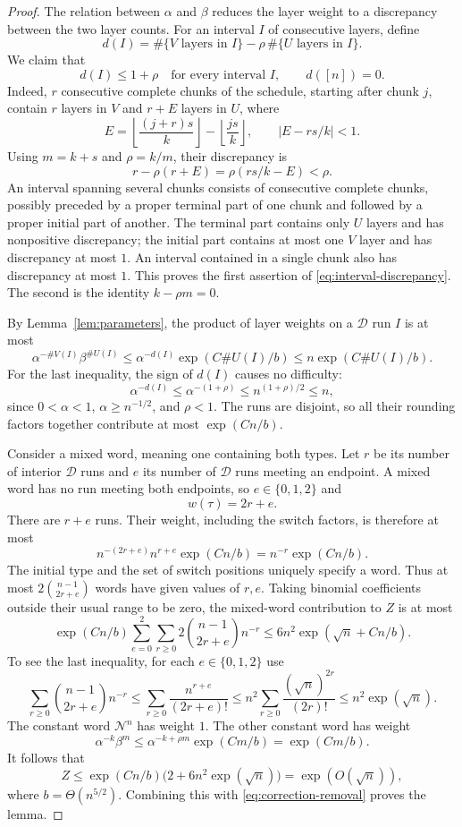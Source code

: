 \begin{proof}
The relation between $\alpha$ and $\beta$ reduces the layer weight
to a discrepancy between the two layer counts. For an interval $I$
of consecutive layers, define
\[
 d(I)=\#\{V\text{ layers in }I\}
       -\rho\,\#\{U\text{ layers in }I\}.
\]
We claim that
\begin{equation}\label{eq:interval-discrepancy}
 d(I)\le1+\rho
 \quad\text{for every interval }I,
 \qquad d([n])=0.
\end{equation}
Indeed, $r$ consecutive complete chunks of the schedule, starting after
chunk $j$, contain $r$ layers in $V$ and $r+E$ layers in $U$, where
\[
 E=\left\lfloor\frac{(j+r)s}{k}\right\rfloor
      -\left\lfloor\frac{js}{k}\right\rfloor,
 \qquad |E-rs/k|<1.
\]
Using $m=k+s$ and $\rho=k/m$, their discrepancy is
\[
 r-\rho(r+E)=\rho(rs/k-E)<\rho.
\]
An interval spanning several chunks consists of consecutive complete
chunks, possibly preceded by a proper terminal part of one chunk and
followed by a proper initial part of another. The terminal part contains
only $U$ layers and has nonpositive discrepancy; the initial part
contains at most one $V$ layer and has discrepancy at most $1$.
An interval contained in a single chunk also has discrepancy at most
$1$. This proves the first assertion of \eqref{eq:interval-discrepancy}.
The second is the identity $k-\rho m=0$.

By Lemma~\ref{lem:parameters}, the product of layer weights on a
$\mathcal D$ run $I$ is at most
\[
 \alpha^{-\#V(I)}\beta^{\#U(I)}
 \le \alpha^{-d(I)}\exp(C\#U(I)/b)
 \le n\exp(C\#U(I)/b).
\]
For the last inequality, the sign of $d(I)$ causes no difficulty:
\[
 \alpha^{-d(I)}\le\alpha^{-(1+\rho)}
 \le n^{(1+\rho)/2}\le n,
\]
since $0<\alpha<1$, $\alpha\ge n^{-1/2}$, and $\rho<1$.
The runs are disjoint, so all their rounding factors together contribute
at most $\exp(Cn/b)$.

Consider a mixed word, meaning one containing both types. Let $r$ be its
number of interior $\mathcal D$ runs and $e$ its number of
$\mathcal D$ runs meeting an endpoint. A mixed word has no run meeting
both endpoints, so $e\in\{0,1,2\}$ and
\[
 w(\tau)=2r+e.
\]
There are $r+e$ runs. Their weight, including the switch factors, is
therefore at most
\[
 n^{-(2r+e)}n^{r+e}\exp(Cn/b)
 =n^{-r}\exp(Cn/b).
\]
The initial type and the set of switch positions uniquely specify a
word. Thus at most $2\binom{n-1}{2r+e}$ words have given values of $r,e$.
Taking binomial coefficients outside their usual range to be zero,
the mixed-word contribution to $Z$ is at most
\[
 \exp(Cn/b)\sum_{e=0}^2\sum_{r\ge0}
             2\binom{n-1}{2r+e}n^{-r}
 \le 6n^2\exp(\sqrt n+Cn/b).
\]
To see the last inequality, for each $e\in\{0,1,2\}$ use
\[
 \sum_{r\ge0}\binom{n-1}{2r+e}n^{-r}
 \le \sum_{r\ge0}\frac{n^{r+e}}{(2r+e)!}
 \le n^2\sum_{r\ge0}\frac{(\sqrt n)^{2r}}{(2r)!}
 \le n^2\exp(\sqrt n).
\]
The constant word $\mathcal N^n$ has weight $1$. The other constant
word has weight
\[
 \alpha^{-k}\beta^m
 \le\alpha^{-k+\rho m}\exp(Cm/b)
 =\exp(Cm/b).
\]
It follows that
\[
 Z\le\exp(Cn/b)\bigl(2+6n^2\exp(\sqrt n)\bigr)
 =\exp(O(\sqrt n)),
\]
where $b=\Theta(n^{5/2})$. Combining this with
\eqref{eq:correction-removal} proves the lemma.
\end{proof}


